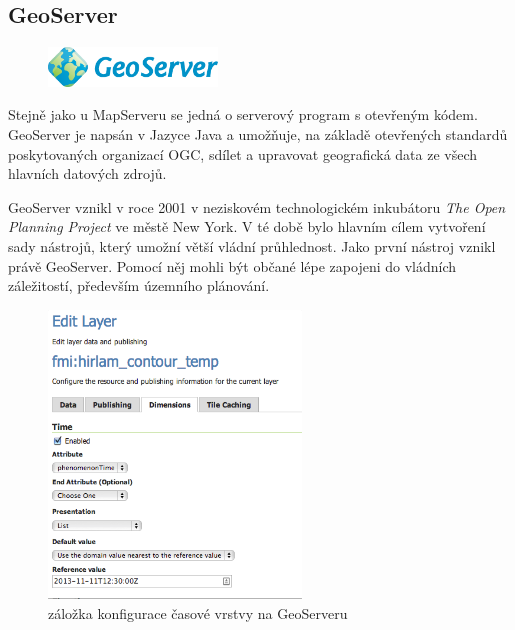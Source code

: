 \newpage
\subsection{GeoServer}

\begin{figure}[h!]
	\centering
	\includegraphics[width=0.4\textwidth]{../img/geoserver-logo.png}
	\label{fig:geoserver-logo}
\end{figure}
\bigskip

Stejně jako u MapServeru se jedná o serverový program s otevřeným kódem. GeoServer je napsán v Jazyce Java a umožňuje, na základě otevřených standardů poskytovaných organizací OGC, sdílet a upravovat geografická data ze všech hlavních datových zdrojů. 

GeoServer vznikl v roce 2001 v neziskovém technologickém inkubátoru \textit{The Open Planning Project} ve městě New York. V té době bylo hlavním cílem vytvoření sady nástrojů, který umožní větší vládní průhlednost. Jako první nástroj vznikl právě GeoServer. Pomocí něj mohli být občané lépe zapojeni do vládních záležitostí, především územního plánování.

\begin{figure}[h!]
	\centering
	\includegraphics[width=0.6\textwidth]{../img/geoserver-layer-edit.png}
	\caption{záložka konfigurace časové vrstvy na GeoServeru \cite{geoserver-layer-edit}}
	\label{fig:geoserver-layer-edit}
\end{figure}

\bigskip
\noindent

